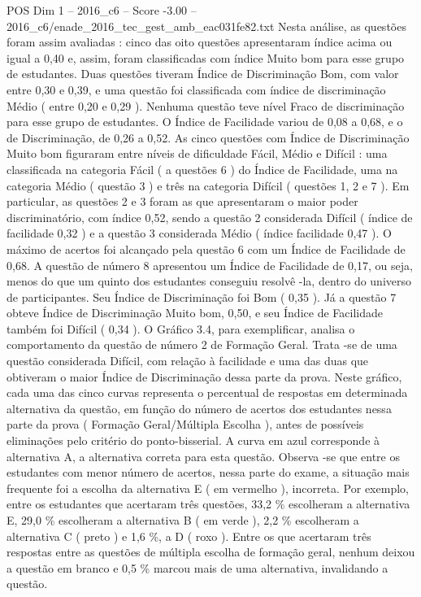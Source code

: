 \begin{textsample}{POS Dim 1 – 2016\_c6 – Score -3.00 – 2016\_c6/enade\_2016\_tec\_gest\_amb\_eac031fe82.txt}
Nesta análise, as questões foram assim avaliadas : cinco das oito questões apresentaram índice acima ou igual a 0,40 e, assim, foram classificadas com índice Muito bom para esse grupo de estudantes.
Duas questões tiveram Índice de Discriminação Bom, com valor entre 0,30 e 0,39, e uma questão foi classificada com índice de discriminação Médio ( entre 0,20 e 0,29 ).
Nenhuma questão teve nível Fraco de discriminação para esse grupo de estudantes.
O Índice de Facilidade variou de 0,08 a 0,68, e o de Discriminação, de 0,26 a 0,52.
As cinco questões com Índice de Discriminação Muito bom figuraram entre níveis de dificuldade Fácil, Médio e Difícil : uma classificada na categoria Fácil ( a questões 6 ) do Índice de Facilidade, uma na categoria Médio ( questão 3 ) e três na categoria Difícil ( questões 1, 2 e 7 ).
Em particular, as questões 2 e 3 foram as que apresentaram o maior poder discriminatório, com índice 0,52, sendo a questão 2 considerada Difícil ( índice de facilidade 0,32 ) e a questão 3 considerada Médio ( índice facilidade 0,47 ).
O máximo de acertos foi alcançado pela questão 6 com um Índice de Facilidade de 0,68.
A questão de número 8 apresentou um Índice de Facilidade de 0,17, ou seja, menos do que um quinto dos estudantes conseguiu resolvê -la, dentro do universo de participantes.
Seu Índice de Discriminação foi Bom ( 0,35 ).
Já a questão 7 obteve Índice de Discriminação Muito bom, 0,50, e seu Índice de Facilidade também foi Difícil ( 0,34 ).
O Gráfico 3.4, para exemplificar, analisa o comportamento da questão de número 2 de Formação Geral.
Trata -se de uma questão considerada Difícil, com relação à facilidade e uma das duas que obtiveram o maior Índice de Discriminação dessa parte da prova.
Neste gráfico, cada uma das cinco curvas representa o percentual de respostas em determinada alternativa da questão, em função do número de acertos dos estudantes nessa parte da prova ( Formação Geral/Múltipla Escolha ), antes de possíveis eliminações pelo critério do ponto-bisserial.
A curva em azul corresponde à alternativa A, a alternativa correta para esta questão.
Observa -se que entre os estudantes com menor número de acertos, nessa parte do exame, a situação mais frequente foi a escolha da alternativa E ( em vermelho ), incorreta.
Por exemplo, entre os estudantes que acertaram três questões, 33,2 \% escolheram a alternativa E, 29,0 \% escolheram a alternativa B ( em verde ), 2,2 \% escolheram a alternativa C ( preto ) e 1,6 \%, a D ( roxo ).
Entre os que acertaram três respostas entre as questões de múltipla escolha de formação geral, nenhum deixou a questão em branco e 0,5 \% marcou mais de uma alternativa, invalidando a questão.

\end{textsample}
